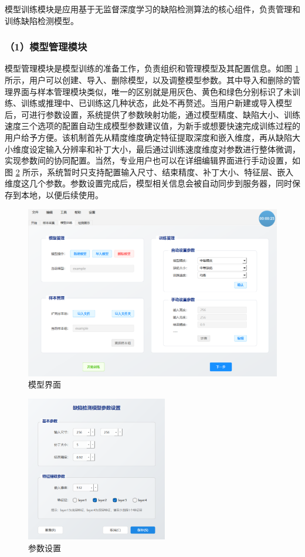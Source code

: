\documentclass[
  ]{njuthesis}
\begin{document}
模型训练模块是应用基于无监督深度学习的缺陷检测算法的核心组件，负责管理和训练缺陷检测模型。

\subsubsection{（1）模型管理模块}

模型管理模块是模型训练的准备工作，负责组织和管理模型及其配置信息。如图 \ref{模型界面} 所示，用户可以创建、导入、删除模型，以及调整模型参数。其中导入和删除的管理界面与样本管理模块类似，唯一的区别就是用灰色、黄色和绿色分别标识了未训练、训练或推理中、已训练这几种状态，此处不再赘述。当用户新建或导入模型后，可进行参数设置，系统提供了参数映射功能，通过模型精度、缺陷大小、训练速度三个选项的配置自动生成模型参数建议值，为新手或想要快速完成训练过程的用户给予方便。该机制首先从精度维度确定特征提取深度和嵌入维度，再从缺陷大小维度设定输入分辨率和补丁大小，最后通过训练速度维度对参数进行整体微调，实现参数间的协同配置。当然，专业用户也可以在详细编辑界面进行手动设置，如图 \ref{参数设置} 所示，系统暂时只支持配置输入尺寸、结束精度、补丁大小、特征层、嵌入维度这几个参数。参数设置完成后，模型相关信息会被自动同步到服务器，同时保存到本地，以便后续使用。

\begin{figure}[H]
    \centering
    \includegraphics[width=\textwidth]{images/模型界面.png}
    \caption{模型界面}
    \label{模型界面}
\end{figure}

\begin{figure}[htb]
    \centering
    \includegraphics[width=0.55\textwidth]{images/参数设置.png}
    \caption{参数设置}
    \label{参数设置}
\end{figure}
\end{document}
